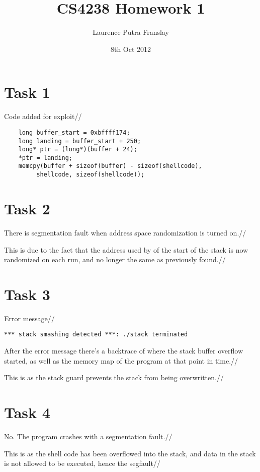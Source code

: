 \documentclass[12pt]{article}
\begin{document}
\title{CS4238 Homework 1}
\author{Laurence Putra Franslay}
\date{8th Oct 2012}
\maketitle

\section{Task 1}
Code added for exploit//
\begin{verbatim}
	long buffer_start = 0xbffff174;
	long landing = buffer_start + 250;
	long* ptr = (long*)(buffer + 24);
	*ptr = landing;
	memcpy(buffer + sizeof(buffer) - sizeof(shellcode),
		 shellcode, sizeof(shellcode));
\end{verbatim}

\section{Task 2}
There is segmentation fault when address space randomization is turned on.//

This is due to the fact that the address used by of the start of the stack is now randomized on each run, and no longer the same as previously found.//

\section{Task 3}
Error message//
\begin{verbatim}
*** stack smashing detected ***: ./stack terminated
\end{verbatim}

After the error message there's a backtrace of where the stack buffer overflow started, as well as the memory map of the program at that point in time.//

This is as the stack guard prevents the stack from being overwritten.//

\section{Task 4}
No. The program crashes with a segmentation fault.//

This is as the shell code has been overflowed into the stack, and data in the stack is not allowed to be executed, hence the segfault//
\enddocument
\end{document}
